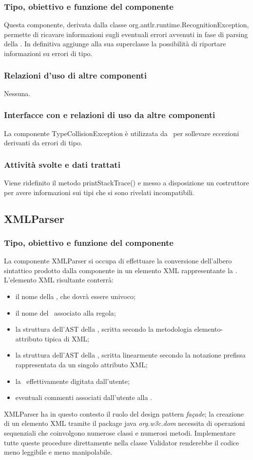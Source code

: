 \documentclass[11pt,titlepage,a4paper]{report}
\begin{document}
\subsubsection{Tipo, obiettivo e funzione del componente}
Questa componente, derivata dalla classe org.antlr.runtime.RecognitionException, permette di ricavare informazioni sugli eventuali errori avvenuti in fase di parsing della \br. In definitiva aggiunge alla sua superclasse la possibilit\`a di riportare informazioni su errori di tipo.
\subsubsection{Relazioni d'uso di altre componenti}
Nessuna.
\subsubsection{Interfacce con e relazioni di uso da altre componenti}
La componente TypeCollisionException \`e utilizzata da \brp\ per sollevare eccezioni derivanti da errori di tipo.
\subsubsection{Attivit\`a svolte e dati trattati}
Viene ridefinito il metodo printStackTrace() e messo a disposizione un costruttore per avere informazioni sui tipi che si sono rivelati incompatibili.

\subsection{XMLParser}%
\subsubsection{Tipo, obiettivo e funzione del componente}
La componente XMLParser si occupa di effettuare la conversione dell'albero sintattico prodotto dalla componente \brp in un elemento XML rappresentante la \br. L'elemento XML risultante conterr\`a:
\begin{itemize}
 \item il nome della \br, che dovr\`a essere univoco;
 \item il nome del \bo\ associato alla regola;
 \item la struttura dell'AST della \br, scritta secondo la metodologia elemento-attributo tipica di XML;
 \item la struttura dell'AST della \br, scritta linearmente secondo la notazione prefissa rappresentata da un singolo attributo XML;
 \item la \br\ effettivamente digitata dall'utente;
 \item eventuali commenti associati dall'utente alla \br.
\end{itemize}
XMLParser ha in questo contesto il ruolo del design pattern \textit{fa\c{c}ade}; la creazione di un elemento XML tramite il package java \textit{org.w3c.dom} necessita di operazioni sequenziali che coinvolgono numerose classi e numerosi metodi. Implementare tutte queste procedure direttamente nella classe Validator renderebbe il codice meno leggibile e meno manipolabile.
\end{document}
